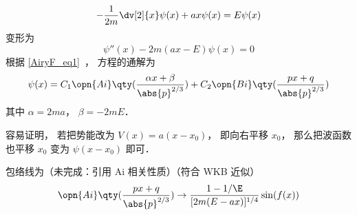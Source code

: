 

\begin{equation}
-\frac{1}{2m}\dv[2]{x}\psi(x) + ax \psi(x) = E\psi(x)
\end{equation}
变形为
\begin{equation}
\psi''(x) - 2m(ax - E)\psi(x) = 0
\end{equation}
根据 \autoref{AiryF_eq1}~， 方程的通解为
\begin{equation}
\psi(x) = C_1\opn{Ai}\qty(\frac{\alpha x+\beta}{\abs{p}^{2/3}}) + C_2 \opn{Bi}\qty(\frac{px+q}{\abs{p}^{2/3}})
\end{equation}
其中 $\alpha = 2ma$， $\beta = -2mE$．

容易证明， 若把势能改为 $V(x) = a(x-x_0)$， 即向右平移 $x_0$， 那么把波函数也平移 $x_0$ 变为 $\psi(x-x_0)$ 即可．

包络线为（未完成：引用 Ai 相关性质）（符合 WKB 近似）
\begin{equation}
\opn{Ai}\qty(\frac{px+q}{\abs{p}^{2/3}}) \to \frac{1-1/\E}{[2m(E-ax)]^{1/4}} \sin(f(x))
\end{equation}
